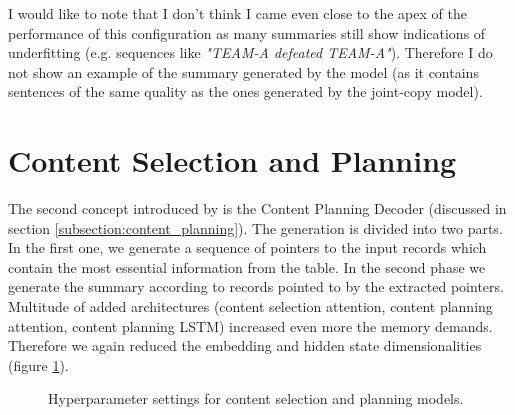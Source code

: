 I would like to note that I don't think I came even close to the apex of the performance of this configuration as many summaries still show indications of underfitting (e.g. sequences like \emph{"TEAM-A defeated TEAM-A"}). Therefore I do not show an example of the summary generated by the model (as it contains sentences of the same quality as the ones generated by the joint-copy model).

\section{Content Selection and Planning}

The second concept introduced by \citep{puduppully2019datatotext} is the Content Planning Decoder (discussed in section \ref{subsection:content_planning}). The generation is divided into two parts. In the first one, we generate a sequence of pointers to the input records which contain the most essential information from the table. In the second phase we generate the summary according to records pointed to by the extracted pointers. Multitude of added architectures (content selection attention, content planning attention, content planning LSTM) increased even more the memory demands. Therefore we again reduced the embedding and hidden state dimensionalities (figure \ref{figure:hyperparameters_content_selection_and_planning}).

\begin{figure}[h]
    \caption{Hyperparameter settings for content selection and planning models.} \label{figure:hyperparameters_content_selection_and_planning}
\end{figure}

